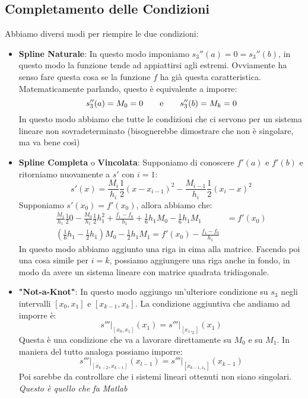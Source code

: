 \documentclass[11pt,a4paper,twoside]{article}
\theoremstyle{definition}
\begin{document}
\subsection{Completamento delle Condizioni}

Abbiamo diversi modi per riempire le due condizioni:
\begin{itemize}
	\item \textbf{Spline Naturale}: In questo modo imponiamo $s_3''(a) = 0 = s_3''(b)$, in questo modo la funzione tende ad appiattirsi agli estremi. Ovviamente ha senso fare questa cosa se la funzione $f$ ha già questa caratteristica. Matematicamente parlando, questo è equivalente a imporre:
		\[ s_3''(a) = M_0 = 0\qquad \text e \qquad s_3''(b) = M_k = 0 \]
		In questo modo abbiamo che tutte le condizioni che ci servono per un sistema lineare non sovradeterminato (bisognerebbe dimostrare che non è singolare, ma va bene così)
	\item \textbf{Spline Completa} o \textbf{Vincolata}: Supponiamo di conoscere $f'(a)$ e $f'(b)$ e ritorniamo nuovamente a $s'$ con $i = 1$:
		\[ s'(x) = \frac{M_i}{h_i} \frac 12 (x-x_{i-1})^2 - \frac{M_{i-1}}{h_i} \frac 12 (x_i-x)^2 \]
		Supponiamo $s'(x_0) = f'(x_0)$, allora abbiamo che:
		\begin{align*}
			\frac{M_1}{h_1} \frac 12 0 - \frac{M_0}{h_1} \frac 12 h_1^2 + \frac{f_1-f_0}{h_1}+ \frac 16 h_1M_0 - \frac 16 h_1 M_1 &= f'(x_0)\\
			\left(\frac 16 h_1 - \frac 12 h_1\right)M_0 - \frac 12 h_1M_1 = f'(x_0) - \frac{f_1-f_0}{h_1}
		\end{align*}
		In questo modo abbiamo aggiunto una riga in cima alla matrice. Facendo poi una cosa simile per $i =k$, possiamo aggiungere una riga anche in fondo, in modo da avere un sistema lineare con matrice quadrata tridiagonale.
	\item \textbf{"Not-a-Knot"}: In questo modo aggiungo un'ulteriore condizione su $s_3$ negli intervalli $[x_0, x_1]$ e $[x_{k-1}, x_k]$. La condizione aggiuntiva che andiamo ad imporre è:
		\[ \left.s'''\right|_{[x_0, x_1]}(x_1) = \left.s'''\right|_{[x_1,_2]}(x_1) \]
		Questa è una condizione che va a lavorare direttamente su $M_0$ e su $M_1$. In maniera del tutto analoga possiamo imporre:
		\[ \left. s'''\right|_{[x_{k-2}, x_{k-1}]}(x_{l-1}) = \left.s'''\right|_{[x_{k-1,x_k}]}(x_{k-1}) \]
		Poi sarebbe da controllare che i sistemi lineari ottenuti non siano singolari. \textit{Questo è quello che fa Matlab}
\end{itemize}
\end{document}
